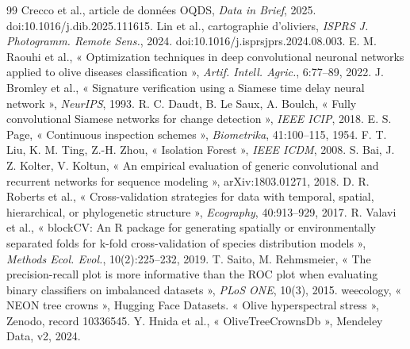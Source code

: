 \documentclass[10pt,a4paper,twocolumn]{article}
\begin{document}
{\footnotesize
\begin{thebibliography}{99}
\setlength{\itemsep}{0pt}
 Crecco et al., article de données OQDS, \emph{Data in Brief}, 2025. doi:10.1016/j.dib.2025.111615.
 Lin et al., cartographie d'oliviers, \emph{ISPRS J. Photogramm. Remote Sens.}, 2024. doi:10.1016/j.isprsjprs.2024.08.003.
 E. M. Raouhi et al., « Optimization techniques in deep convolutional neuronal networks applied to olive diseases classification », \emph{Artif. Intell. Agric.}, 6:77--89, 2022.
 J. Bromley et al., « Signature verification using a Siamese time delay neural network », \emph{NeurIPS}, 1993.
 R. C. Daudt, B. Le Saux, A. Boulch, « Fully convolutional Siamese networks for change detection », \emph{IEEE ICIP}, 2018.
 E. S. Page, « Continuous inspection schemes », \emph{Biometrika}, 41:100--115, 1954.
 F. T. Liu, K. M. Ting, Z.-H. Zhou, « Isolation Forest », \emph{IEEE ICDM}, 2008.
 S. Bai, J. Z. Kolter, V. Koltun, « An empirical evaluation of generic convolutional and recurrent networks for sequence modeling », arXiv:1803.01271, 2018.
 D. R. Roberts et al., « Cross-validation strategies for data with temporal, spatial, hierarchical, or phylogenetic structure », \emph{Ecography}, 40:913--929, 2017.
 R. Valavi et al., « blockCV: An R package for generating spatially or environmentally separated folds for k-fold cross-validation of species distribution models », \emph{Methods Ecol. Evol.}, 10(2):225--232, 2019.
 T. Saito, M. Rehmsmeier, « The precision-recall plot is more informative than the ROC plot when evaluating binary classifiers on imbalanced datasets », \emph{PLoS ONE}, 10(3), 2015.
 weecology, « NEON tree crowns », Hugging Face Datasets.
 « Olive hyperspectral stress », Zenodo, record 10336545.
 Y. Hnida et al., « OliveTreeCrownsDb », Mendeley Data, v2, 2024.
\end{thebibliography}
}
\end{document}

